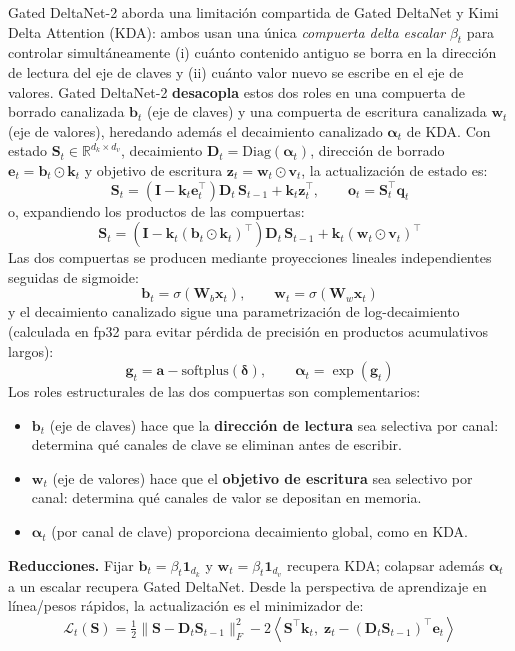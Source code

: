 Gated DeltaNet-2 \citep{hatamizadeh_gated_deltanet2_2026} aborda una limitación compartida de Gated DeltaNet y Kimi Delta Attention (KDA): ambos usan una única \emph{compuerta delta escalar} $\beta_t$ para controlar simultáneamente (i) cuánto contenido antiguo se borra en la dirección de lectura del eje de claves y (ii) cuánto valor nuevo se escribe en el eje de valores. Gated DeltaNet-2 \textbf{desacopla} estos dos roles en una compuerta de borrado canalizada $\mathbf{b}_t$ (eje de claves) y una compuerta de escritura canalizada $\mathbf{w}_t$ (eje de valores), heredando además el decaimiento canalizado $\boldsymbol{\alpha}_t$ de KDA. Con estado $\mathbf{S}_t \in \mathbb{R}^{d_k \times d_v}$, decaimiento $\mathbf{D}_t = \mathrm{Diag}(\boldsymbol{\alpha}_t)$, dirección de borrado $\mathbf{e}_t = \mathbf{b}_t \odot \mathbf{k}_t$ y objetivo de escritura $\mathbf{z}_t = \mathbf{w}_t \odot \mathbf{v}_t$, la actualización de estado es:
\[
\mathbf{S}_t = \left(\mathbf{I} - \mathbf{k}_t \mathbf{e}_t^\top\right) \mathbf{D}_t \, \mathbf{S}_{t-1} + \mathbf{k}_t \mathbf{z}_t^\top, \qquad \mathbf{o}_t = \mathbf{S}_t^\top \mathbf{q}_t
\]
o, expandiendo los productos de las compuertas:
\[
\mathbf{S}_t = \left(\mathbf{I} - \mathbf{k}_t (\mathbf{b}_t \odot \mathbf{k}_t)^\top\right) \mathbf{D}_t \, \mathbf{S}_{t-1} + \mathbf{k}_t (\mathbf{w}_t \odot \mathbf{v}_t)^\top
\]
Las dos compuertas se producen mediante proyecciones lineales independientes seguidas de sigmoide:
\[
\mathbf{b}_t = \sigma(\mathbf{W}_b \mathbf{x}_t), \qquad \mathbf{w}_t = \sigma(\mathbf{W}_w \mathbf{x}_t)
\]
y el decaimiento canalizado sigue una parametrización de log-decaimiento (calculada en fp32 para evitar pérdida de precisión en productos acumulativos largos):
\[
\mathbf{g}_t = \mathbf{a} - \mathrm{softplus}(\boldsymbol{\delta}), \qquad \boldsymbol{\alpha}_t = \exp(\mathbf{g}_t)
\]
Los roles estructurales de las dos compuertas son complementarios:
\begin{itemize}[leftmargin=*]
    \item $\mathbf{b}_t$ (eje de claves) hace que la \textbf{dirección de lectura} sea selectiva por canal: determina qué canales de clave se eliminan antes de escribir.
    \item $\mathbf{w}_t$ (eje de valores) hace que el \textbf{objetivo de escritura} sea selectivo por canal: determina qué canales de valor se depositan en memoria.
    \item $\boldsymbol{\alpha}_t$ (por canal de clave) proporciona decaimiento global, como en KDA.
\end{itemize}
\textbf{Reducciones.} Fijar $\mathbf{b}_t = \beta_t \mathbf{1}_{d_k}$ y $\mathbf{w}_t = \beta_t \mathbf{1}_{d_v}$ recupera KDA; colapsar además $\boldsymbol{\alpha}_t$ a un escalar recupera Gated DeltaNet. Desde la perspectiva de aprendizaje en línea/pesos rápidos, la actualización es el minimizador de:
\[
\mathcal{L}_t(\mathbf{S}) = \tfrac{1}{2}\|\mathbf{S} - \mathbf{D}_t \mathbf{S}_{t-1}\|_F^2 - 2\left\langle \mathbf{S}^\top \mathbf{k}_t,\; \mathbf{z}_t - (\mathbf{D}_t \mathbf{S}_{t-1})^\top \mathbf{e}_t \right\rangle
\]

